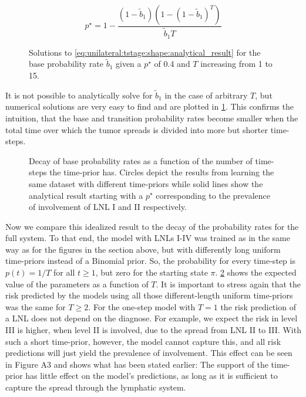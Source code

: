 \documentclass[\relativeRoot/main.tex]{subfiles}
\begin{document}
%
\begin{equation} \label{eq:unilateral:tstage:shape:analytical_result}
    p^{\star} = 1 - \frac{\left(1 - \tilde{b}_1\right) \left( 1 - (1 - \tilde{b}_1)^T \right)}{\tilde{b}_1 T}
\end{equation}
%
\begin{figure}
    \centering
    \def\svgwidth{0.7\textwidth}
    
    \caption{Solutions to \cref{eq:unilateral:tstage:shape:analytical_result} for the base probability rate $\tilde{b}_1$ given a $p^{\star}$ of 0.4 and $T$ increasing from 1 to 15.}
    \label{fig:unilateral:tstage:shape:rate_decay_analytic}
\end{figure}

It is not possible to analytically solve for $\tilde{b}_1$ in the case of arbitrary $T$, but numerical solutions are very easy to find and are plotted in \cref{fig:unilateral:tstage:shape:rate_decay_analytic}. This confirms the intuition, that the base and transition probability rates become smaller when the total time over which the tumor spreads is divided into more but shorter time-steps.

\begin{figure}
    \centering
    \def\svgwidth{1.0\textwidth}
    
    \caption{Decay of base probability rates as a function of the number of time-steps the time-prior has. Circles depict the results from learning the same dataset with different time-priors while solid lines show the analytical result starting with a $p^{\star}$ corresponding to the prevalence of involvement of LNL I and II respectively.}
    \label{fig:unilateral:tstage:shape:rate_decay_sampled}
\end{figure}

Now we compare this idealized result to the decay of the probability rates for the full system. To that end, the model with LNLs I-IV was trained as in the same way as for the figures in the section above, but with differently long uniform time-priors instead of a Binomial prior. So, the probability for every time-step is $p(t)=1/T$ for all $t \geq 1$, but zero for the starting state $\pi$. \cref{fig:unilateral:tstage:shape:rate_decay_sampled} shows the expected value of the parameters as a function of $T$. It is important to stress again that the risk predicted by the models using all those different-length uniform time-priors was the same for $T \geq 2$. For the one-step model with $T=1$ the risk prediction of a LNL does not depend on the diagnose. For example, we expect the risk in level III is higher, when level II is involved, due to the spread from LNL II to III. With such a short time-prior, however, the model cannot capture this, and all risk predictions will just yield the prevalence of involvement. This effect can be seen in Figure A3 and shows what has been stated earlier: The support of the time-prior has little effect on the model's predictions, as long as it is sufficient to capture the spread through the lymphatic system.
\end{document}
